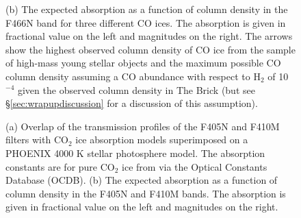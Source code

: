 \documentclass[times,astrosymb,twocolumn]{aastex631}
\def\rr#1{#1}
\begin{document}
\begin{figure}
{    %
    (\rr{b}) The expected absorption as a function of column density in the F466N band for three different CO ices.  %
    The absorption is given in fractional value on the left and magnitudes on the right.
    The arrow\rr{s} show the highest observed column density of CO ice from the \citet{Boogert2022} sample of high-mass young stellar objects \rr{and the maximum possible CO column density assuming a CO abundance with respect to H$_2$ of 10$^{-4}$ given the observed column density in The Brick (but see \S \ref{sec:wrapupdiscussion} for a discussion of this assumption).}
    }
    \label{fig:icemodel}
\end{figure}
\begin{figure}
    \centering
    \caption{
    (\rr{a}) Overlap of the transmission profiles of the F405N and F410M filters with CO$_2$ ice absorption models superimposed on a PHOENIX 4000 K stellar photosphere model.
    The absorption constants are for pure CO$_2$ ice from \citet{Hudgins1993} via the Optical Constants Database (OCDB).
    (\rr{b}) The expected absorption as a function of column density in the F405N and F410M bands.
    The absorption is given in fractional value on the left and magnitudes on the right.
    }
    \label{fig:co2icemodel}
\end{figure}
\end{document}
